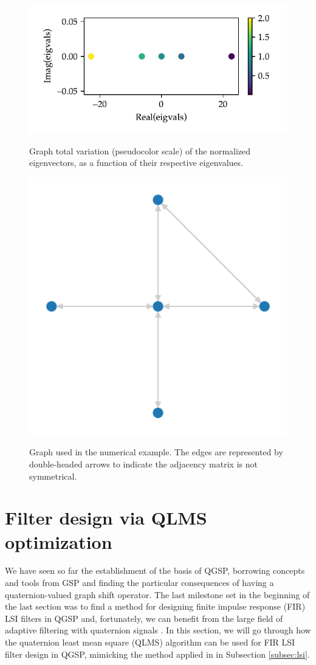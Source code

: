 \begin{figure}
    \centering
    \caption{Graph total variation (pseudocolor scale) of the normalized eigenvectors, as a function of their respective eigenvalues.}
    \includegraphics[width=0.55\linewidth]{Figures/simple_example_tv.pdf}
    \floatsource
    \label{fig:simple_example_tv}
\end{figure}

\begin{figure}
    \centering
    \caption{Graph used in the numerical example. The edges are represented by double-headed arrows to indicate the adjacency matrix is not symmetrical.}
    \includegraphics[width=0.3\linewidth]{Figures/degenerate_qgft_graph.pdf}
    \floatsource
    \label{fig:degenerate_qgft_graph}
\end{figure}

\section{Filter design via QLMS optimization}
We have seen so far the establishment of the basis of QGSP, borrowing concepts and tools from GSP and finding the particular consequences of having a quaternion-valued graph shift operator. The last milestone set in the beginning of the last section was to find a method for designing finite impulse response (FIR) LSI filters in QGSP and, fortunately, we can benefit from the large field of adaptive filtering with quaternion signals \cite{ortolani2017frequency}. In this section, we will go through how the quaternion least mean square (QLMS) algorithm can be used for FIR LSI filter design in QGSP, mimicking the method applied in in Subsection \ref{subsec:lsi}.

